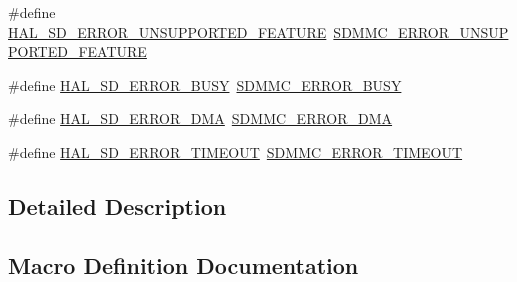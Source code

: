 \begin{DoxyCompactItemize}
\item 
\#define \mbox{\hyperlink{group___s_d___exported___constansts___group1_ga362a78a40fc94cecdc9b3a6f09eb8d62}{H\+A\+L\+\_\+\+S\+D\+\_\+\+E\+R\+R\+O\+R\+\_\+\+U\+N\+S\+U\+P\+P\+O\+R\+T\+E\+D\+\_\+\+F\+E\+A\+T\+U\+RE}}~\mbox{\hyperlink{group___s_d_m_m_c___l_l___exported___constants_ga069b2ed51212ad872174262cc49a48e8}{S\+D\+M\+M\+C\+\_\+\+E\+R\+R\+O\+R\+\_\+\+U\+N\+S\+U\+P\+P\+O\+R\+T\+E\+D\+\_\+\+F\+E\+A\+T\+U\+RE}}
\item 
\#define \mbox{\hyperlink{group___s_d___exported___constansts___group1_ga2c66eda7262fefbae29e403f13432baa}{H\+A\+L\+\_\+\+S\+D\+\_\+\+E\+R\+R\+O\+R\+\_\+\+B\+U\+SY}}~\mbox{\hyperlink{group___s_d_m_m_c___l_l___exported___constants_gaaea1bf5ab746268b578c341c2de5dbe1}{S\+D\+M\+M\+C\+\_\+\+E\+R\+R\+O\+R\+\_\+\+B\+U\+SY}}
\item 
\#define \mbox{\hyperlink{group___s_d___exported___constansts___group1_gac36505ad032b1ef786571bae5d5c4745}{H\+A\+L\+\_\+\+S\+D\+\_\+\+E\+R\+R\+O\+R\+\_\+\+D\+MA}}~\mbox{\hyperlink{group___s_d_m_m_c___l_l___exported___constants_ga2b572322b71e5f4c9002a88d25d0f61e}{S\+D\+M\+M\+C\+\_\+\+E\+R\+R\+O\+R\+\_\+\+D\+MA}}
\item 
\#define \mbox{\hyperlink{group___s_d___exported___constansts___group1_gaf41713485da46adb0cc93a279de59349}{H\+A\+L\+\_\+\+S\+D\+\_\+\+E\+R\+R\+O\+R\+\_\+\+T\+I\+M\+E\+O\+UT}}~\mbox{\hyperlink{group___s_d_m_m_c___l_l___exported___constants_ga7adade4abd724bab3cc60349bef6732d}{S\+D\+M\+M\+C\+\_\+\+E\+R\+R\+O\+R\+\_\+\+T\+I\+M\+E\+O\+UT}}
\end{DoxyCompactItemize}


\subsection{Detailed Description}


\subsection{Macro Definition Documentation}
\mbox{\label{group___s_d___exported___constansts___group1_ga43d7de63d0e4b974adce4679d586ab1d}} 
